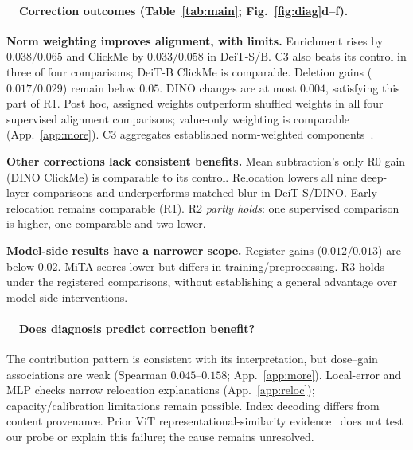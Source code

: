 \documentclass{article}
\newcommand{\rsub}[1]{\refstepcounter{subsection}\paragraph{\thesubsection~~#1}}
\begin{document}
\begin{table}[t]
\caption{Layers 9--12; higher scores are better. Superscript arrows: higher/lower versus R0 (model-side rows: DeiT-S). $\diamond$: higher than matched control; \textbf{bold}: higher than both. Unmarked tested cells: comparable. Controls are indented. GAE~\citep{chefer2021generic}: descriptive, gradient-based, all 12 layers. Enr./Click./Del.: enrichment/ClickMe/deletion. Verdicts use unrounded data; paired intervals: Table~\ref{tab:app-paired}.}
\label{tab:main}
\centering\footnotesize
\setlength{\tabcolsep}{2.6pt}\renewcommand{\arraystretch}{1.0}

\end{table}

\rsub{Correction outcomes (Table~\ref{tab:main}; Fig.~\ref{fig:diag}d--f).}
\textbf{Norm weighting improves alignment, with limits.} Enrichment rises by $0.038/0.065$ and ClickMe by $0.033/0.058$ in DeiT-S/B. C3 also beats its control in three of four comparisons; DeiT-B ClickMe is comparable. Deletion gains ($0.017/0.029$) remain below $0.05$. DINO changes are at most $0.004$, satisfying this part of R1. Post hoc, assigned weights outperform shuffled weights in all four supervised alignment comparisons; value-only weighting is comparable (App.~\ref{app:more}). C3 aggregates established norm-weighted components~\citep{kobayashi2020,zhu2024}.

\smallskip\noindent\textbf{Other corrections lack consistent benefits.} Mean subtraction's only R0 gain (DINO ClickMe) is comparable to its control. Relocation lowers all nine deep-layer comparisons and underperforms matched blur in DeiT-S/DINO. Early relocation remains comparable (R1). R2 \emph{partly holds}: one supervised comparison is higher, one comparable and two lower.

\smallskip\noindent\textbf{Model-side results have a narrower scope.} Register gains ($0.012/0.013$) are below $0.02$. MiTA scores lower but differs in training/preprocessing. R3 holds under the registered comparisons, without establishing a general advantage over model-side interventions.

\rsub{Does diagnosis predict correction benefit?} The contribution pattern is consistent with its interpretation, but dose--gain associations are weak (Spearman $0.045$--$0.158$; App.~\ref{app:more}). Local-error and MLP checks narrow relocation explanations (App.~\ref{app:reloc}); capacity/calibration limitations remain possible. Index decoding differs from content provenance. Prior ViT representational-similarity evidence~\citep{raghu2021} does not test our probe or explain this failure; the cause remains unresolved.
\end{document}
